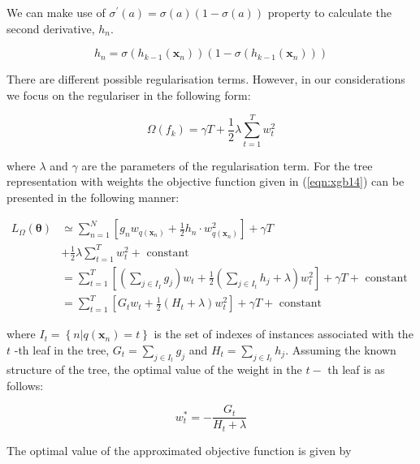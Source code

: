 We can make use of $\sigma^{\prime}(a)=\sigma(a)(1-\sigma(a))$ property to calculate the second derivative, $h_{n}$.

\begin{equation}
h_{n}=\sigma\left(h_{k-1}\left(\mathbf{x}_{n}\right)\right)\left(1-\sigma\left(h_{k-1}\left(\mathbf{x}_{n}\right)\right)\right)
\end{equation}

There are different possible regularisation terms. However, in our considerations we focus on the regulariser in the following form:

\begin{equation}
\Omega\left(f_{k}\right)=\gamma T+\frac{1}{2} \lambda \sum_{t=1}^{T} w_{t}^{2}
\end{equation}

where $\lambda$ and $\gamma$ are the parameters of the regularisation term. For the tree representation with weights the objective function given in (\autoref{eqn:xgb14}) can be presented in the following manner:

\begin{equation}
\begin{aligned}
L_{\Omega}(\boldsymbol{\theta}) & \simeq \sum_{n=1}^{N}\left[g_{n} w_{q\left(\mathbf{x}_{n}\right)}+\frac{1}{2} h_{n} \cdot w_{q\left(\mathbf{x}_{n}\right)}^{2}\right]+\gamma T \\
&+\frac{1}{2} \lambda \sum_{t=1}^{T} w_{t}^{2}+\text { constant } \\
&=\sum_{t=1}^{T}\left[\left(\sum_{j \in I_{I}} g_{j}\right) w_{t}+\frac{1}{2}\left(\sum_{j \in I_{t}} h_{j}+\lambda\right) w_{t}^{2}\right]+\gamma T+\text { constant } \\
&=\sum_{t=1}^{T}\left[G_{t} w_{t}+\frac{1}{2}\left(H_{t}+\lambda\right) w_{t}^{2}\right]+\gamma T+\text { constant }
\end{aligned}
\end{equation}

where $I_{t}=\left\{n | q\left(\mathbf{x}_{n}\right)=t\right\}$ is the set of indexes of instances associated with the $t$ -th leaf in the tree, $G_{t}=\sum_{j \in I_{t}} g_{j}$ and $H_{t}=\sum_{j \in I_{t}} h_{j} .$ Assuming the known structure of the tree, the optimal value of the weight in the $t-$ th leaf is as follows:


\begin{equation}
w_{t}^{*}=-\frac{G_{t}}{H_{t}+\lambda}
\end{equation}

The optimal value of the approximated objective function is given by

